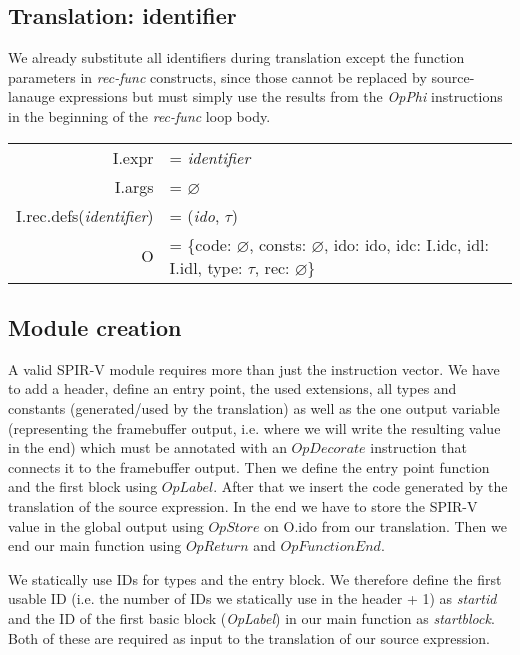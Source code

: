 \documentclass[letterpaper,12pt]{article}
\begin{document}
\subsection{Translation: identifier}

We already substitute all identifiers during translation except the function parameters in \textit{rec-func}
constructs, since those cannot be replaced by source-lanauge expressions
but must simply use the results from the \textit{OpPhi} instructions
in the beginning of the \textit{rec-func} loop body.

\medskip
\begin{tabularx}{\linewidth}{rl}
	I.expr &= \textit{identifier} \\
	I.args &= $\varnothing$ \\
	I.rec.defs(\textit{identifier}) &= (\textit{ido}, $\tau$) \\
	O &= \{code: $\varnothing$, consts: $\varnothing$, ido: ido, idc: I.idc, idl: I.idl, type: $\tau$, rec: $\varnothing$\} \\
\end{tabularx}

\subsection{Module creation}

A valid SPIR-V module requires more than just the instruction vector.
We have to add a header, define an entry point, the used extensions,
all types and constants (generated/used by the translation) as well as the one
output variable (representing the framebuffer output, i.e. where we will
write the resulting value in the end) which must be annotated with
an $OpDecorate$ instruction that connects it to the framebuffer output.
Then we define the entry point function and the first block using
$OpLabel$. After that we insert the code generated by the translation
of the source expression. In the end we have to store the SPIR-V value
in the global output using $OpStore$ on O.ido from our translation.
Then we end our main function using $OpReturn$ and $OpFunctionEnd$.

We statically use IDs for types and the entry block. We therefore
define the first usable ID (i.e. the number of IDs we statically use in
the header + 1) as \textit{startid} and the ID of the first basic
block (\textit{OpLabel}) in our main function as \textit{startblock}.
Both of these are required as input to the translation of our source
expression.
\end{document}
